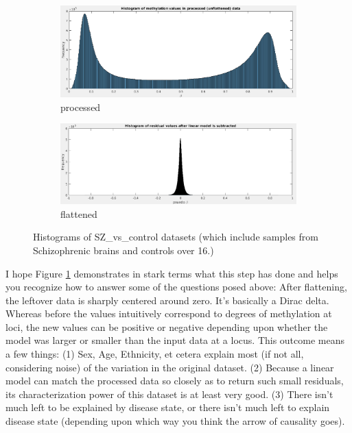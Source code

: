 \documentclass[]{article}
\begin{document}
  \begin{figure}[H]
    \centering
    \begin{subfigure}{.95\textwidth}
      \centering
      \includegraphics[width=1\linewidth]{hist1.png}
      \caption{processed}
    \end{subfigure}
    \begin{subfigure}{.95\textwidth}
      \centering
      \includegraphics[width=1\linewidth]{hist2.png}
      \caption{flattened}
    \end{subfigure}
    \caption{Histograms of SZ\_vs\_control datasets (which include samples from Schizophrenic brains and controls over 16.)}
    \label{fig:hists}
  \end{figure}

  I hope Figure \ref{fig:hists} demonstrates in stark terms what this step has done and helps you recognize how to answer some of the questions posed above: After flattening, the leftover data is sharply centered around zero. It's basically a Dirac delta. Whereas before the values intuitively correspond to degrees of methylation at loci, the new values can be positive or negative depending upon whether the model was larger or smaller than the input data at a locus. This outcome means a few things: (1) Sex, Age, Ethnicity, et cetera explain most (if not all, considering noise) of the variation in the original dataset. (2) Because a linear model can match the processed data so closely as to return such small residuals, its characterization power of this dataset is at least very good. (3) There isn't much left to be explained by disease state, or there isn't much left to explain disease state (depending upon which way you think the arrow of causality goes).
\end{document}
